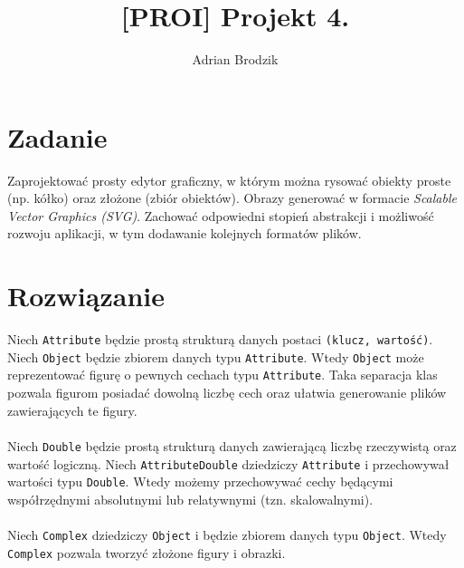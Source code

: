 \documentclass[a4paper, 12pt]{article}
\title{[PROI] Projekt 4.}
\author{Adrian Brodzik}
\begin{document}
\maketitle

\section*{Zadanie}
Zaprojektować prosty edytor graficzny, w którym można rysować obiekty proste (np. kółko) oraz złożone (zbiór obiektów). Obrazy generować w formacie \textit{Scalable Vector Graphics (SVG)}. Zachować odpowiedni stopień abstrakcji i możliwość rozwoju aplikacji, w tym dodawanie kolejnych formatów plików.

\section*{Rozwiązanie}
Niech \texttt{Attribute} będzie prostą strukturą danych postaci \texttt{(klucz, wartość)}. Niech \texttt{Object} będzie zbiorem danych typu \texttt{Attribute}. Wtedy \texttt{Object} może reprezentować figurę o pewnych cechach typu \texttt{Attribute}. Taka separacja klas pozwala figurom posiadać dowolną liczbę cech oraz ułatwia generowanie plików zawierających te figury.
\\\\
Niech \texttt{Double} będzie prostą strukturą danych zawierającą liczbę rzeczywistą oraz wartość logiczną. Niech \texttt{AttributeDouble} dziedziczy \texttt{Attribute} i przechowywał wartości typu \texttt{Double}. Wtedy możemy przechowywać cechy będącymi współrzędnymi absolutnymi lub relatywnymi (tzn. skalowalnymi).
\\\\
Niech \texttt{Complex} dziedziczy \texttt{Object} i będzie zbiorem danych typu \texttt{Object}. Wtedy \texttt{Complex} pozwala tworzyć złożone figury i obrazki.

\pagebreak
\end{document}
